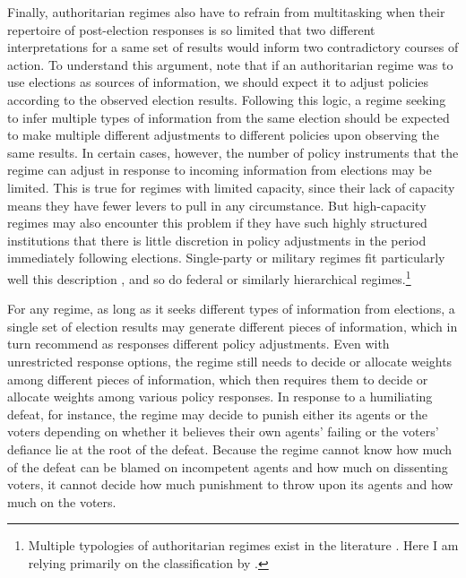\documentclass[12pt]{article}
\newcommand{\1}{\mathbbm{1}}
\begin{document}
Finally, authoritarian regimes also have to refrain from multitasking when their repertoire of post-election responses is so limited that two different interpretations for a same set of results would inform two contradictory courses of action. To understand this argument, note that if an authoritarian regime was to use elections as sources of information, we should expect it to adjust policies according to the observed election results. Following this logic, a regime seeking to infer multiple types of information from the same election should be expected to make multiple different adjustments to different policies upon observing the same results. In certain cases, however, the number of policy instruments that the regime can adjust in response to incoming information from elections may be limited. This is true for regimes with limited capacity, since their lack of capacity means they have fewer levers to pull in any circumstance. But high-capacity regimes may also encounter this problem if they have such highly structured institutions that there is little discretion in policy adjustments in the period immediately following elections. Single-party or military regimes fit particularly well this description , and so do federal or similarly hierarchical regimes.\footnote{Multiple typologies of authoritarian regimes exist in the literature \citep[see, for instance,][]{GeddesWrightFrantz2014, Wahman2013}. Here I am relying primarily on the classification by \citet{GeddesWrightFrantz2014}.}

For any regime, as long as it seeks different types of information from elections, a single set of election results may generate different pieces of information, which in turn recommend as responses different policy adjustments. Even with unrestricted response options, the regime still needs to decide or allocate weights among different pieces of information, which then requires them to decide or allocate weights among various policy responses. In response to a humiliating defeat, for instance, the regime may decide to punish either its agents or the voters depending on whether it believes their own agents' failing or the voters' defiance lie at the root of the defeat. Because the regime cannot know how much of the defeat can be blamed on incompetent agents and how much on dissenting voters, it cannot decide how much punishment to throw upon its agents and how much on the voters.
\end{document}
